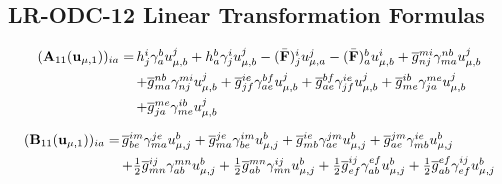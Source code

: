 \begin{subappendices}
\section{LR-ODC-12 Linear Transformation Formulas}
\label{sec:linear-transformation-formulas}

\begin{equation}
    \begin{array}{r@{\,}l}
        (\mathbf{A}_{11}(\mathbf{u}_{\mu,1}))_{ia}
        =
        &
        h_j^i
        \gamma_a^b
        u_{\mu,b}^j
        +
        h_a^b
        \gamma_j^i
        u_{\mu,b}^j
        -
        (\bar{\mathbf{F}})_j^i
        u_{\mu,a}^j
        -
        (\bar{\mathbf{F}})_a^b
        u_{\mu,b}^i
        +
        \overline{g}_{nj}^{mi}
        \gamma_{ma}^{nb}
        u_{\mu,b}^j
        \\[5pt]
        &
        +
        \overline{g}_{ma}^{nb}
        \gamma_{nj}^{mi}
        u_{\mu,b}^j
        +
        \overline{g}_{jf}^{ie}
        \gamma_{ae}^{bf}
        u_{\mu,b}^j
        +
        \overline{g}_{ae}^{bf}
        \gamma_{jf}^{ie}
        u_{\mu,b}^j
        +
        \overline{g}_{me}^{ib}
        \gamma_{ja}^{me}
        u_{\mu,b}^j
        \\[5pt]
        &
        +
        \overline{g}_{ja}^{me}
        \gamma_{me}^{ib}
        u_{\mu,b}^j
    \end{array}
\end{equation}

\begin{equation}
    \begin{array}{r@{\,}l}
        (\mathbf{B}_{11}(\mathbf{u}_{\mu,1}))_{ia}
        =
        &
        \overline{g}_{be}^{im}
        \gamma_{ma}^{je}
        u_{\mu,j}^b
        +
        \overline{g}_{ma}^{je}
        \gamma_{be}^{im}
        u_{\mu,j}^b
        +
        \overline{g}_{mb}^{ie}
        \gamma_{ae}^{jm}
        u_{\mu,j}^b
        +
        \overline{g}_{ae}^{jm}
        \gamma_{mb}^{ie}
        u_{\mu,j}^b
        \\[5pt]
        &
        +
        \tfrac{1}{2}
        \overline{g}_{mn}^{ij}
        \gamma_{ab}^{mn}
        u_{\mu,j}^b
        +
        \tfrac{1}{2}
        \overline{g}_{ab}^{mn}
        \gamma_{mn}^{ij}
        u_{\mu,j}^b
        +
        \tfrac{1}{2}
        \overline{g}_{ef}^{ij}
        \gamma_{ab}^{ef}
        u_{\mu,j}^b
        +
        \tfrac{1}{2}
        \overline{g}_{ab}^{ef}
        \gamma_{ef}^{ij}
        u_{\mu,j}^b
    \end{array}
\end{equation}


\end{subappendices}
